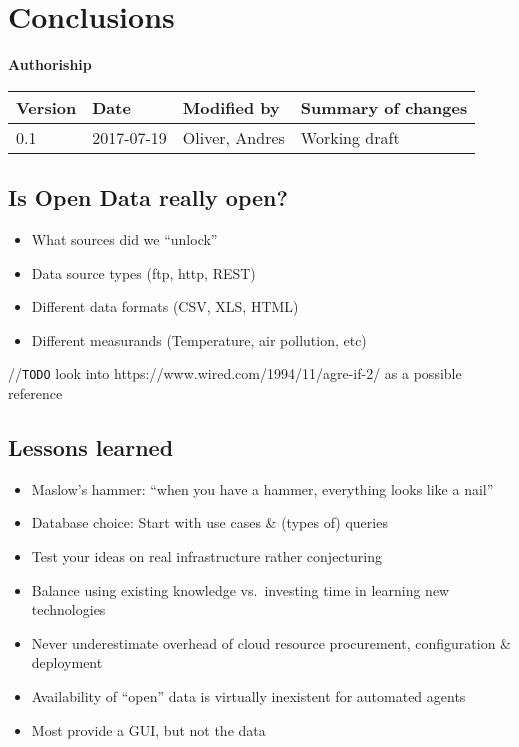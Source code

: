 \section{Conclusions}\label{conclusions}

\textbf{Authoriship}

\begin{longtable}[]{@{}llll@{}}
\toprule
Version & Date & Modified by & Summary of changes\tabularnewline
\midrule
\endhead
0.1 & 2017-07-19 & Oliver, Andres & Working draft\tabularnewline
\bottomrule
\end{longtable}

\subsection{Is Open Data really open?}\label{is-open-data-really-open}

\begin{itemize}
\tightlist
\item
  What sources did we ``unlock''
\item
  Data source types (ftp, http, REST)
\item
  Different data formats (CSV, XLS, HTML)
\item
  Different measurands (Temperature, air pollution, etc)
\end{itemize}

//\texttt{TODO} look into https://www.wired.com/1994/11/agre-if-2/ as a
possible reference

\subsection{Lessons learned}\label{lessons-learned}

\begin{itemize}
\tightlist
\item
  Maslow's hammer: ``when you have a hammer, everything looks like a
  nail''
\item
  Database choice: Start with use cases \& (types of) queries
\item
  Test your ideas on real infrastructure rather conjecturing
\item
  Balance using existing knowledge vs.~investing time in learning new
  technologies
\item
  Never underestimate overhead of cloud resource procurement,
  configuration \& deployment
\item
  Availability of ``open'' data is virtually inexistent for automated
  agents
\item
  Most provide a GUI, but not the data
\end{itemize}

